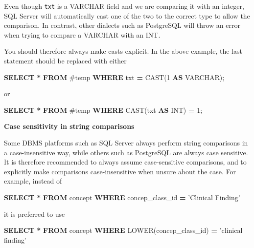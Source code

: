 \documentclass[11pt]{book}
\newenvironment{Shaded}{\begin{snugshade}}{\end{snugshade}}
\newcommand{\DataTypeTok}[1]{\textcolor[rgb]{0.13,0.29,0.53}{#1}}
\newcommand{\DecValTok}[1]{\textcolor[rgb]{0.00,0.00,0.81}{#1}}
\newcommand{\FunctionTok}[1]{\textcolor[rgb]{0.00,0.00,0.00}{#1}}
\newcommand{\KeywordTok}[1]{\textcolor[rgb]{0.13,0.29,0.53}{\textbf{#1}}}
\newcommand{\NormalTok}[1]{#1}
\newcommand{\OperatorTok}[1]{\textcolor[rgb]{0.81,0.36,0.00}{\textbf{#1}}}
\newcommand{\StringTok}[1]{\textcolor[rgb]{0.31,0.60,0.02}{#1}}
\theoremstyle{definition}
\theoremstyle{definition}
\theoremstyle{definition}
\theoremstyle{remark}
\begin{document}
Even though \texttt{txt} is a VARCHAR field and we are comparing it with an integer, SQL Server will automatically cast one of the two to the correct type to allow the comparison. In contrast, other dialects such as PostgreSQL will throw an error when trying to compare a VARCHAR with an INT.

You should therefore always make casts explicit. In the above example, the last statement should be replaced with either

\begin{Shaded}
\begin{Highlighting}[]
\KeywordTok{SELECT} \OperatorTok{*} \KeywordTok{FROM}\NormalTok{ #temp }\KeywordTok{WHERE}\NormalTok{ txt }\OperatorTok{=} \FunctionTok{CAST}\NormalTok{(}\DecValTok{1} \KeywordTok{AS} \DataTypeTok{VARCHAR}\NormalTok{);}
\end{Highlighting}
\end{Shaded}

or

\begin{Shaded}
\begin{Highlighting}[]
\KeywordTok{SELECT} \OperatorTok{*} \KeywordTok{FROM}\NormalTok{ #temp }\KeywordTok{WHERE} \FunctionTok{CAST}\NormalTok{(txt }\KeywordTok{AS} \DataTypeTok{INT}\NormalTok{) }\OperatorTok{=} \DecValTok{1}\NormalTok{;}
\end{Highlighting}
\end{Shaded}

\textbf{Case sensitivity in string comparisons}

Some DBMS platforms such as SQL Server always perform string comparisons in a case-insensitive way, while others such as PostgreSQL are always case sensitive. It is therefore recommended to always assume case-sensitive comparisons, and to explicitly make comparisons case-insensitive when unsure about the case. For example, instead of

\begin{Shaded}
\begin{Highlighting}[]
\KeywordTok{SELECT} \OperatorTok{*} \KeywordTok{FROM}\NormalTok{ concept }\KeywordTok{WHERE}\NormalTok{ concep_class_id }\OperatorTok{=} \StringTok{'Clinical Finding'}
\end{Highlighting}
\end{Shaded}

it is preferred to use

\begin{Shaded}
\begin{Highlighting}[]
\KeywordTok{SELECT} \OperatorTok{*} \KeywordTok{FROM}\NormalTok{ concept }\KeywordTok{WHERE} \FunctionTok{LOWER}\NormalTok{(concep_class_id) }\OperatorTok{=} \StringTok{'clinical finding'}
\end{Highlighting}
\end{Shaded}
\end{document}
